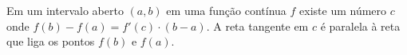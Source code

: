 Em um intervalo aberto $(a, b)$ em uma função contínua $f$ existe um número $c$ onde $f(b)-f(a)=f'(c) \cdot (b-a)$. A reta tangente em $c$ é paralela à reta que liga os pontos $f(b)$ e $f(a)$.